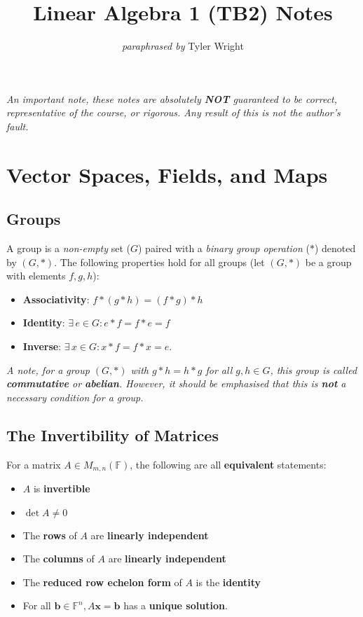 \documentclass[a4paper, 12pt, twoside]{article}
\begin{document}
\title{Linear Algebra 1 (TB2) Notes}
\date{}
\author{\textit{paraphrased by} Tyler Wright}
\maketitle

\vfill

\textit{An important note, these notes are absolutely \textbf{NOT}
  guaranteed to be correct, representative of the course, or rigorous.
  Any result of this is not the author's fault.}

\newpage

\section{Vector Spaces, Fields, and Maps}

\subsection{Groups}

A group is a \textit{non-empty} set ($G$) paired with a
\textit{binary group operation} ($*$) denoted by $(G, *)$.
The following properties hold for all groups (let $(G, *)$
be a group with elements $f, g, h$):

\begin{itemize}
  \item \textbf{Associativity}: $f * (g * h) = (f * g) * h$
  \item \textbf{Identity}: $\exists \, e \in G : e * f = f * e = f$
  \item \textbf{Inverse}: $\exists \, x \in G : x * f = f * x = e$.
\end{itemize}

\textit{A note, for a group $(G, *)$ with $g * h = h * g$ for all $g, h \in G$,
  this group is called \textbf{commutative} or \textbf{abelian}. However, it
  should be emphasised that this is \textbf{not} a necessary condition for
  a group.}

\subsection{The Invertibility of Matrices}

For a matrix $A \in M_{m, n}( \mathbb{F} )$, the following are all
\textbf{equivalent} statements:

\begin{itemize}
  \item $A$ is \textbf{invertible}
  \item $\det{A} \neq 0$
  \item The \textbf{rows} of $A$ are \textbf{linearly independent}
  \item The \textbf{columns} of $A$ are \textbf{linearly independent}
  \item The \textbf{reduced row echelon form} of $A$ is the \textbf{identity}
  \item For all $\textbf{b} \in \mathbb{F}^n, A\textbf{x} = \textbf{b}$ has
        a \textbf{unique solution}.
\end{itemize}
\end{document}
